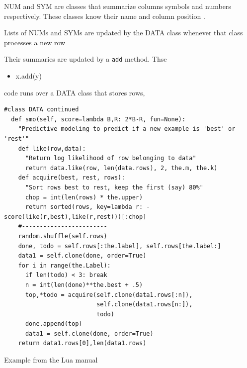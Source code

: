 NUM and SYM are classes that summarize columns symbols and numbers respectively.
These classes know their name and column position . 

Lists of NUMs and SYMs are updated by  the DATA class whenever that class
processes a new row 

Their summaries are updated by a \verb+add+ method. Thse
\begin{itemize}
    \item x.add(y) 
\end{itemize}code runs over a DATA class that stores rows, 


\begin{listing}[!ht]
\begin{verbatim}
#class DATA continued
  def smo(self, score=lambda B,R: 2*B-R, fun=None):
    "Predictive modeling to predict if a new example is 'best' or 'rest'"
    def like(row,data):
      "Return log likelihood of row belonging to data"
      return data.like(row, len(data.rows), 2, the.m, the.k)
    def acquire(best, rest, rows):
      "Sort rows best to rest, keep the first (say) 80%"
      chop = int(len(rows) * the.upper)
      return sorted(rows, key=lambda r: -score(like(r,best),like(r,rest)))[:chop]
    #------------------------
    random.shuffle(self.rows)
    done, todo = self.rows[:the.label], self.rows[the.label:]
    data1 = self.clone(done, order=True)
    for i in range(the.Label):
      if len(todo) < 3: break
      n = int(len(done)**the.best + .5)
      top,*todo = acquire(self.clone(data1.rows[:n]),
                          self.clone(data1.rows[n:]),
                          todo)
      done.append(top)
      data1 = self.clone(done, order=True)
    return data1.rows[0],len(data1.rows)
\end{verbatim}
\caption{Example from the Lua manual}
\label{listing:3}
\end{listing}


